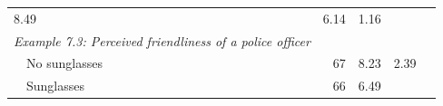 \documentclass[11pt,a4paper,openany]{book}
\begin{document}
\begin{longtable}[]{@{}lrrrr@{}}
\begin{minipage}[t]{0.10\columnwidth}
8.49\strut
\end{minipage} & \begin{minipage}[t]{0.07\columnwidth}\raggedleft\strut
6.14\strut
\end{minipage} & \begin{minipage}[t]{0.08\columnwidth}\raggedleft\strut
1.16\strut
\end{minipage}\tabularnewline
\begin{minipage}[t]{0.55\columnwidth}\raggedright\strut
\emph{Example 7.3: Perceived friendliness of a police officer}\strut
\end{minipage} & \begin{minipage}[t]{0.06\columnwidth}\raggedleft\strut
\strut
\end{minipage} & \begin{minipage}[t]{0.10\columnwidth}\raggedleft\strut
\strut
\end{minipage} & \begin{minipage}[t]{0.07\columnwidth}\raggedleft\strut
\strut
\end{minipage} & \begin{minipage}[t]{0.08\columnwidth}\raggedleft\strut
\strut
\end{minipage}\tabularnewline
\begin{minipage}[t]{0.55\columnwidth}\raggedright\strut
~~No sunglasses\strut
\end{minipage} & \begin{minipage}[t]{0.06\columnwidth}\raggedleft\strut
67\strut
\end{minipage} & \begin{minipage}[t]{0.10\columnwidth}\raggedleft\strut
8.23\strut
\end{minipage} & \begin{minipage}[t]{0.07\columnwidth}\raggedleft\strut
2.39\strut
\end{minipage} & \begin{minipage}[t]{0.08\columnwidth}\raggedleft\strut
\strut
\end{minipage}\tabularnewline
\begin{minipage}[t]{0.55\columnwidth}\raggedright\strut
~~Sunglasses \newline\strut
\end{minipage} & \begin{minipage}[t]{0.06\columnwidth}\raggedleft\strut
66\strut
\end{minipage} & \begin{minipage}[t]{0.10\columnwidth}\raggedleft\strut
6.49\strut

\end{minipage}
\end{longtable}
\end{document}
